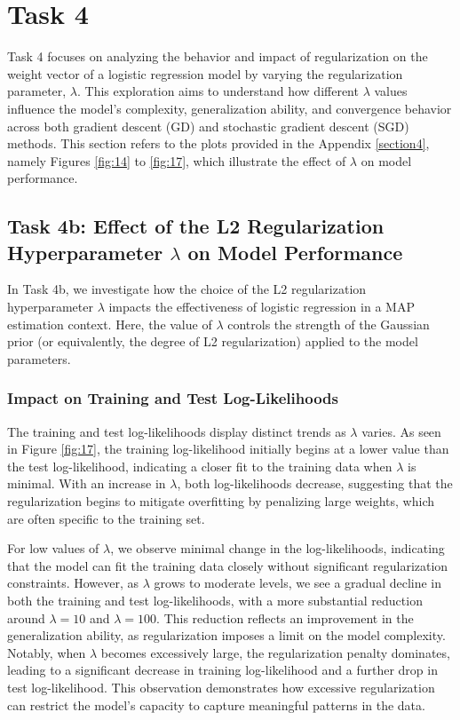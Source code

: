 \documentclass[a4paper,oneside,bibliography=totoc]{scrartcl}
\begin{document}
\section{Task 4}
Task 4 focuses on analyzing the behavior and impact of regularization on the weight vector of a logistic regression model by varying the regularization parameter, $\lambda$. This exploration aims to understand how different $\lambda$ values influence the model’s complexity, generalization ability, and convergence behavior across both gradient descent (GD) and stochastic gradient descent (SGD) methods. This section refers to the plots provided in the Appendix \ref{section4}, namely Figures \ref{fig:14} to \ref{fig:17}, which illustrate the effect of $\lambda$ on model performance.

\subsection{Task 4b: Effect of the L2 Regularization Hyperparameter $\lambda$ on Model Performance}

In Task 4b, we investigate how the choice of the L2 regularization hyperparameter $\lambda$ impacts the effectiveness of logistic regression in a MAP estimation context. Here, the value of $\lambda$ controls the strength of the Gaussian prior (or equivalently, the degree of L2 regularization) applied to the model parameters.

\subsubsection{Impact on Training and Test Log-Likelihoods}

The training and test log-likelihoods display distinct trends as $\lambda$ varies. As seen in Figure \ref{fig:17}, the training log-likelihood initially begins at a lower value than the test log-likelihood, indicating a closer fit to the training data when $\lambda$ is minimal. With an increase in $\lambda$, both log-likelihoods decrease, suggesting that the regularization begins to mitigate overfitting by penalizing large weights, which are often specific to the training set.

For low values of $\lambda$, we observe minimal change in the log-likelihoods, indicating that the model can fit the training data closely without significant regularization constraints. However, as $\lambda$ grows to moderate levels, we see a gradual decline in both the training and test log-likelihoods, with a more substantial reduction around $\lambda = 10$ and $\lambda = 100$. This reduction reflects an improvement in the generalization ability, as regularization imposes a limit on the model complexity. Notably, when $\lambda$ becomes excessively large, the regularization penalty dominates, leading to a significant decrease in training log-likelihood and a further drop in test log-likelihood. This observation demonstrates how excessive regularization can restrict the model’s capacity to capture meaningful patterns in the data.
\end{document}
